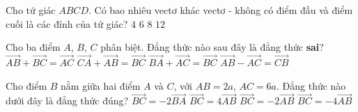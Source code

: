 \begin{ex}%
Cho tứ giác $ABCD$. Có bao nhiêu vectơ khác vectơ - không có điểm đầu và điểm cuối là các đỉnh của tứ giác?
\choice
{$4$}
{$6$}
{$8$}
{\True $12$}
\end{ex}

\begin{ex}%
Cho ba điểm $A$, $B$, $C$ phân biệt. Đẳng thức nào sau đây là đẳng thức \textbf{sai}?
\choice
{$\overrightarrow{AB}+\overrightarrow{BC}=\overrightarrow{AC}$}
{\True $\overrightarrow{CA}+\overrightarrow{AB}=\overrightarrow{BC}$}
{$\overrightarrow{BA}+\overrightarrow{AC}=\overrightarrow{BC}$}
{$\overrightarrow{AB}-\overrightarrow{AC}=\overrightarrow{CB}$}
\end{ex}

\begin{ex}%
	Cho điểm $B$ nằm giữa hai điểm $A$ và $C$, với $AB=2a$, $AC=6a$. Đẳng thức nào dưới đây là đẳng thức đúng?
	\choice
	{\True $\overrightarrow{B C}=-2 \overrightarrow{B A}$}
	{$\overrightarrow{B C}=4 \overrightarrow{A B}$}
	{$\overrightarrow{B C}=-2 \overrightarrow{A B}$}
	{$\overrightarrow{B C}=-4 \overrightarrow{A B}$}
\end{ex}

